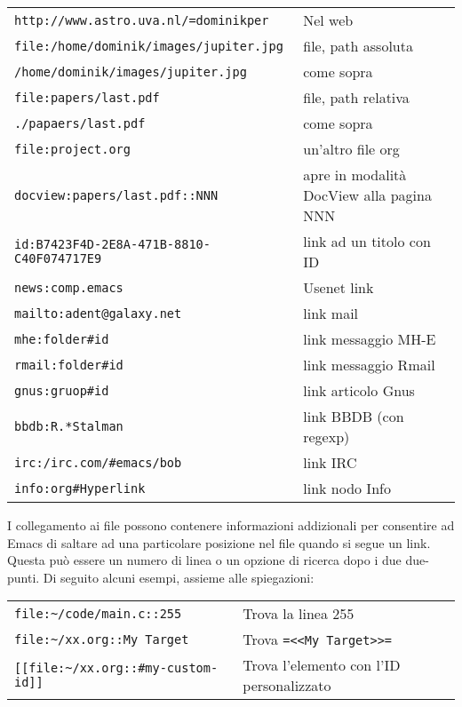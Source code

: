 \documentclass[11pt]{article}
\begin{document}
\begin{center}
\begin{tabular}{ll}
\texttt{http://www.astro.uva.nl/=dominikper} & Nel web\\[0pt]
\texttt{file:/home/dominik/images/jupiter.jpg} & file, path assoluta\\[0pt]
\texttt{/home/dominik/images/jupiter.jpg} & come sopra\\[0pt]
\texttt{file:papers/last.pdf} & file, path relativa\\[0pt]
\texttt{./papaers/last.pdf} & come sopra\\[0pt]
\texttt{file:project.org} & un'altro file org\\[0pt]
\texttt{docview:papers/last.pdf::NNN} & apre in modalità DocView alla pagina NNN\\[0pt]
\texttt{id:B7423F4D-2E8A-471B-8810-C40F074717E9} & link ad un titolo con ID\\[0pt]
\texttt{news:comp.emacs} & Usenet link\\[0pt]
\texttt{mailto:adent@galaxy.net} & link mail\\[0pt]
\texttt{mhe:folder\#id} & link messaggio MH-E\\[0pt]
\texttt{rmail:folder\#id} & link messaggio Rmail\\[0pt]
\texttt{gnus:gruop\#id} & link articolo Gnus\\[0pt]
\texttt{bbdb:R.*Stalman} & link BBDB (con regexp)\\[0pt]
\texttt{irc:/irc.com/\#emacs/bob} & link IRC\\[0pt]
\texttt{info:org\#Hyperlink} & link nodo Info\\[0pt]
\end{tabular}
\end{center}

I collegamento ai file possono contenere informazioni addizionali per
consentire ad Emacs di saltare ad una particolare posizione nel file
quando si segue un link. Questa può essere un numero di linea o un
opzione di ricerca dopo i due due-punti. Di seguito alcuni esempi,
assieme alle spiegazioni:

\begin{center}
\begin{tabular}{ll}
\texttt{file:\textasciitilde{}/code/main.c::255} & Trova la linea 255\\[0pt]
\texttt{file:\textasciitilde{}/xx.org::My Target} & Trova \texttt{=<{}<{}My Target>{}>{}=}\\[0pt]
\texttt{[[file:\textasciitilde{}/xx.org::\#my-custom-id]]} & Trova l'elemento con l'ID personalizzato\\[0pt]
\end{tabular}
\end{center}
\end{document}
